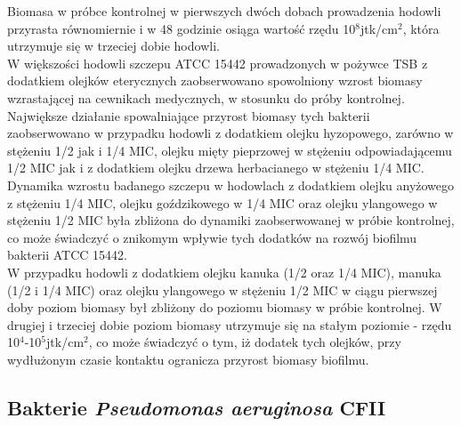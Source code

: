 \documentclass[11pt,a4paper]{report}
\begin{document}
\clearpage
Biomasa w próbce kontrolnej w pierwszych dwóch dobach prowadzenia hodowli przyrasta równomiernie i w 48 godzinie osiąga wartość rzędu 10$^8$jtk/cm$^2$, która utrzymuje się w trzeciej dobie hodowli.\\
W większości hodowli szczepu ATCC 15442 prowadzonych w pożywce TSB z dodatkiem olejków eterycznych zaobserwowano spowolniony wzrost biomasy wzrastającej na cewnikach medycznych, w stosunku do próby kontrolnej.
Największe działanie spowalniające przyrost biomasy tych bakterii zaobserwowano w przypadku hodowli z dodatkiem olejku hyzopowego, zarówno w stężeniu 1/2 jak i 1/4 MIC, olejku mięty pieprzowej w stężeniu odpowiadającemu 1/2 MIC jak i z dodatkiem olejku drzewa herbacianego w stężeniu 1/4 MIC.\\
Dynamika wzrostu badanego szczepu w hodowlach z dodatkiem olejku anyżowego z stężeniu 1/4 MIC, olejku goździkowego w 1/4 MIC oraz olejku ylangowego w stężeniu 1/2 MIC była zbliżona do dynamiki zaobserwowanej w próbie kontrolnej, co może świadczyć o znikomym wpływie tych dodatków na rozwój biofilmu bakterii ATCC 15442.\\
W przypadku hodowli z dodatkiem olejku kanuka (1/2 oraz 1/4 MIC), manuka (1/2 i 1/4 MIC) oraz olejku ylangowego w stężeniu 1/2 MIC w ciągu pierwszej doby poziom biomasy był zbliżony do poziomu biomasy w próbie kontrolnej. W drugiej i trzeciej dobie poziom biomasy utrzymuje się na stałym poziomie - rzędu 10$^4$-10$^5$jtk/cm$^2$, co może świadczyć o tym, iż dodatek tych olejków, przy wydłużonym czasie kontaktu ogranicza przyrost biomasy biofilmu. 


\clearpage

\subsection{Bakterie \textit{Pseudomonas aeruginosa} CFII}
\end{document}
